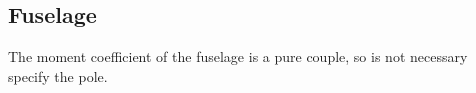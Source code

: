 %


\subsection{Fuselage}
The moment coefficient of the fuselage is a pure couple, so is not necessary specify the pole.



